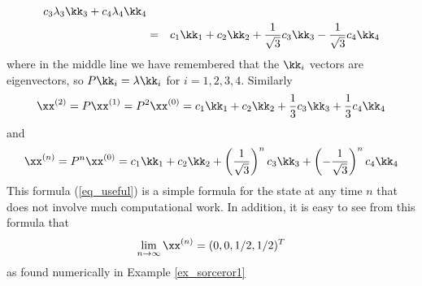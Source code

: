 \begin{example}
{\begin{eqnarray*}
      c_3 \lambda_3 \kk_3 + c_4 \lambda_4 \kk_4 \\
& = & c_1 \kk_1 + c_2 \kk_2 + 
      \frac{1}{\sqrt{3}} c_3 \kk_3 -\frac{1}{\sqrt{3}} c_4 \kk_4
\end{eqnarray*}
where in the middle line we have remembered that the $\kk_i$ vectors 
are eigenvectors, so $P \kk_i = \lambda \kk_i$ for $i=1,2,3,4$. 
Similarly 
\[
\xx^{(2)} = P \xx^{(1)} = P^2 \xx^{(0)} = 
    c_1 \kk_1 + c_2 \kk_2 +
      \frac{1}{3} c_3 \kk_3 +\frac{1}{3} c_4 \kk_4
\]
and 
\begin{equation}
\label{eq_useful}
\xx^{(n)} = P^n \xx^{(0)} = 
    c_1 \kk_1 + c_2 \kk_2 +
      \left(\frac{1}{\sqrt{3}}\right)^n c_3 \kk_3 
      +\left(-\frac{1}{\sqrt{3}}\right)^n c_4 \kk_4
\end{equation}
This formula (\ref{eq_useful}) is a simple formula for the state at any 
time $n$ that does not involve much computational work. In addition, it 
is easy to see from this formula that
\[
\lim_{n \rightarrow \infty} \xx^{(n)} = (0,0,1/2,1/2)^T
\]
as found numerically in Example \ref{ex_sorceror1}
}
\end{example}

